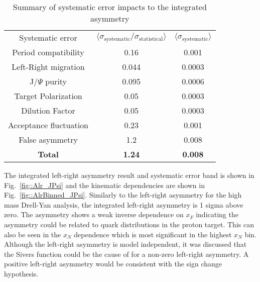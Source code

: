 \begin{table}[h!t]
  \centering
  \begin{tabular}{|c|c|c|}
    \hline
    \multirow{2}{*}{Systematic error}&
    \multirow{2}{*}{
      $\langle \sigma_{\mathrm{systematic}}/\sigma_{\mathrm{statistical}}
      \rangle$} &
    \multirow{2}{*}{$\langle \sigma_{\mathrm{systematic}} \rangle$}\\
    & & \\ \hline \hline

    Period compatibility& 0.16& 0.001\\ \hline

    Left-Right migration& 0.044& 0.0003\\ \hline

    J/$\Psi$ purity& 0.095& 0.0006\\ \hline

    Target Polarization& 0.05& 0.0003\\ \hline

    Dilution Factor& 0.05& 0.0003\\ \hline

    Acceptance fluctuation& 0.23 & 0.001\\ \hline

    False asymmetry& 1.2 & 0.008\\ \hline \hline
    \textbf{Total}& \textbf{1.24} & \textbf{0.008}\\\hline
    
  \end{tabular}
  \caption{Summary of systematic error impacts to the integrated asymmetry}
  \label{tab::sysErrorJPsi}
\end{table}

The integrated left-right asymmetry result and systematic error band is shown in
Fig.~\ref{fig::Alr_JPsi} and the kinematic dependencies are shown in
Fig.~\ref{fig::AlrBinned_JPsi}.  Similarly to the left-right asymmetry for the
high mass Drell-Yan analysis, the integrated left-right asymmetry is 1 sigma
above zero.  The asymmetry shows a weak inverse dependence on $x_F$ indicating
the asymmetry could be related to quark distributions in the proton target.
This can also be seen in the $x_N$ dependence which is most significant in the
highest $x_N$ bin.  Although the left-right asymmetry is model independent, it
was discussed that the Sivers function could be the cause of for a non-zero
left-right asymmetry.  A positive left-right asymmetry would be consistent with
the sign change hypothesis.

